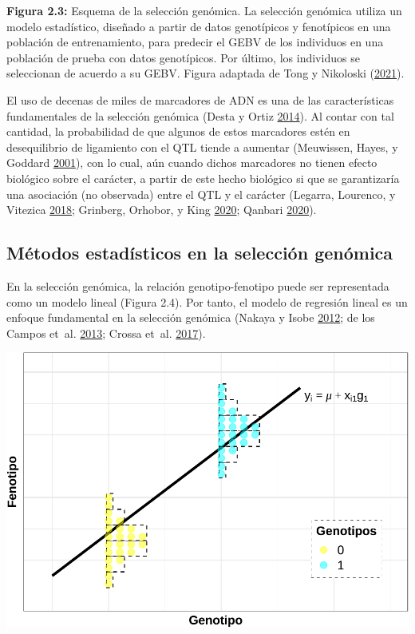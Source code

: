\documentclass[11pt,spanish,a4paper,oneside,]{book} %
\begin{document}
\begin{center}
\textbf{Figura 2.3:} Esquema de la selección genómica. La selección genómica utiliza un modelo estadístico, diseñado a partir de datos genotípicos y fenotípicos en una población de entrenamiento, para predecir el GEBV de los individuos en una población de prueba con datos genotípicos. Por último, los individuos se seleccionan de acuerdo a su GEBV. Figura adaptada de Tong y Nikoloski (\protect\hyperlink{ref-cite:7}{2021}).

\end{center}

El uso de decenas de miles de marcadores de ADN es una de las características fundamentales de la selección genómica (Desta y Ortiz \protect\hyperlink{ref-cite:10}{2014}). Al contar con tal cantidad, la probabilidad de que algunos de estos marcadores estén en desequilibrio de ligamiento con el QTL tiende a aumentar (Meuwissen, Hayes, y Goddard \protect\hyperlink{ref-cite:8}{2001}), con lo cual, aún cuando dichos marcadores no tienen efecto biológico sobre el carácter, a partir de este hecho biológico si que se garantizaría una asociación (no observada) entre el QTL y el carácter (Legarra, Lourenco, y Vitezica \protect\hyperlink{ref-cite:30}{2018}; Grinberg, Orhobor, y King \protect\hyperlink{ref-cite:35}{2020}; Qanbari \protect\hyperlink{ref-cite:36}{2020}).

\hypertarget{muxe9todos-estaduxedsticos-en-la-selecciuxf3n-genuxf3mica}{%
\subsection{Métodos estadísticos en la selección genómica}\label{muxe9todos-estaduxedsticos-en-la-selecciuxf3n-genuxf3mica}}

En la selección genómica, la relación genotipo-fenotipo puede ser representada como un modelo lineal (Figura 2.4). Por tanto, el modelo de regresión lineal es un enfoque fundamental en la selección genómica (Nakaya y Isobe \protect\hyperlink{ref-cite:6}{2012}; de los Campos et~al. \protect\hyperlink{ref-cite:31}{2013}; Crossa et~al. \protect\hyperlink{ref-cite:37}{2017}).

\begin{center}\includegraphics[width=1\linewidth]{figures/Mod_RL} \end{center}
\end{document}

